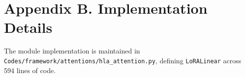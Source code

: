 \section*{Appendix B. Implementation Details}
The module implementation is maintained in \texttt{Codes/framework/attentions/hla\_attention.py}, defining \texttt{LoRALinear} across 594 lines of code.
